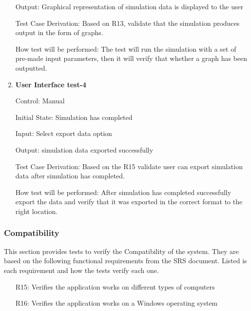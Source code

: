 \documentclass[12pt, titlepage]{article}
\begin{document}
\begin{enumerate}
  Output: Graphical representation of simulation data is displayed to the user
  
  Test Case Derivation: Based on R13, validate that the simulation produces output in the form of graphs.
  
  How test will be performed: The test will run the simulation with a set of pre-made input parameters, then it will verify that whether a graph has been outputted. 
  \item {} \hypertarget{User Interface test-4}{\textbf{User Interface test-4}} \label{User Interface test-4}
  
  Control: Manual
            
  Initial State: Simulation has completed
            
  Input: Select export data option
            
  Output: simulation data exported successfully
  
  Test Case Derivation: Based on the R15 validate user can export simulation data after simulation has completed.
  
  How test will be performed: After simulation has completed successfully export the data and verify that it was exported in the correct format to the right location.

\end{enumerate}

  \subsubsection{Compatibility}

  This section provides tests to verify the Compatibility of the system.
They are based on the following functional requirements from the SRS document.
Listed is each requirement and how the tests verify each one.
\begin{itemize}
  \item [R15:] Verifies the application works on different types of computers
  \item [R16:] Verifies the application works on a Windows operating system
\end{itemize}
\end{document}
